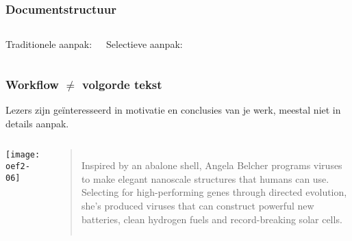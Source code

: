 \documentclass[aspectratio=169]{beamer}
\begin{document}
\begin{frame}[plain]
  \frametitle{Documentstructuur}
  
  \begin{columns}
    \begin{center}
      Traditionele aanpak:
      
    \end{center}
    \begin{center}
      Selectieve aanpak:
      
    \end{center}
  \end{columns}
\end{frame}

\begin{frame}
  \frametitle{Workflow $\ne$ volgorde tekst}
  
  Lezers zijn geïnteresseerd in motivatie en conclusies van je werk, meestal niet in details aanpak.
  
  \vfill
  
  \begin{columns}
    \texttt{[image: oef2-06]}
    
    \begin{quotation}
      Inspired by an abalone shell, Angela Belcher programs viruses to make elegant nanoscale structures that humans can use. Selecting for high-performing genes through directed evolution, she’s produced viruses that can construct powerful new batteries, clean hydrogen fuels and record-breaking solar cells.
    \end{quotation}
  \end{columns}
\end{frame}
\end{document}
